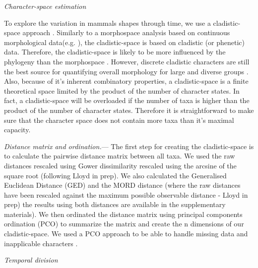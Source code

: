 \documentclass[12pt,letterpaper]{article}
\renewcommand{\subsection}[1]{%
\bigskip
\begin{center}
\begin{large}
\normalfont\itshape #1
\end{large}
\end{center}}
\renewcommand{\subsubsection}[1]{%
\vspace{2ex}
\noindent
\textit{#1.}---}
\begin{document}
\subsection{Character-space estimation}
To explore the variation in mammals shapes through time, we use a cladistic-space approach \cite{Foote01071994,Foote29111996,Wesley-Hunt2005,Brusatte12092008,friedmanexplosive2010,toljagictriassic-jurassic2013}. Similarly to a morphospace analysis based on continuous morphological data(e.g. \cite{finlay2015morphological}), the cladistic-space is based on cladistic (or phenetic) data. Therefore, the cladistic-space is likely to be more influenced by the phylogeny than the morphospace \citep{Foote29111996,Wagner01011997}. However, discrete cladistic characters are still the best source for quantifying overall morphology for large and diverse groups \citep{Brusatte12092008}. Also, because of it's inherent combinatory properties, a cladistic-space is a finite theoretical space limited by the product of the number of character states. In fact, a cladistic-space will be overloaded if the number of taxa is higher than the product of the number of character states. Therefore it is straightforward to make sure that the character space does not contain more taxa than it's maximal capacity.

\subsubsection{Distance matrix and ordination}
The first step for creating the cladistic-space is to calculate the pairwise distance matrix between all taxa. We used the raw distances rescaled using Gower \cite{Gower71} dissimilarity rescaled using the arcsine of the square root (following Lloyd in prep). We also calculated the Generalised Euclidean Distance (GED) \cite{Wills2001} and the MORD distance (where the raw distances have been rescaled against the maximum possible observable distance  - Lloyd in prep) the results using both distances are available in the supplementary materials). We then ordinated the distance matrix using principal components ordination (PCO) to summarize the matrix and create the n dimensions of our cladistic-space. We used a PCO approach to be able to handle missing data and inapplicable characters \cite{lofgren2003,Wesley-Hunt2005}.

\subsection{Temporal division}
\end{document}
